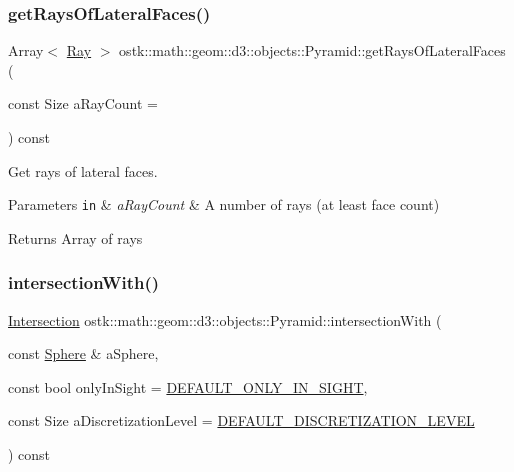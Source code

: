 \subsubsection{\texorpdfstring{get\+Rays\+Of\+Lateral\+Faces()}{getRaysOfLateralFaces()}}
{\footnotesize\ttfamily Array$<$ \hyperlink{classostk_1_1math_1_1geom_1_1d3_1_1objects_1_1_ray}{Ray} $>$ ostk\+::math\+::geom\+::d3\+::objects\+::\+Pyramid\+::get\+Rays\+Of\+Lateral\+Faces (\begin{DoxyParamCaption}\item[{const Size}]{a\+Ray\+Count = {} }\end{DoxyParamCaption}) const}



Get rays of lateral faces. 


\begin{DoxyParams}[1]{Parameters}
\mbox{\tt in}  & {\em a\+Ray\+Count} & A number of rays (at least face count) \\
\hline
\end{DoxyParams}
\begin{DoxyReturn}{Returns}
Array of rays 
\end{DoxyReturn}
\mbox{\label{classostk_1_1math_1_1geom_1_1d3_1_1objects_1_1_pyramid_a254b6d83bb83794852fe13317728ddf0}} 
\subsubsection{\texorpdfstring{intersection\+With()}{intersectionWith()}\hspace{0.1cm}{\footnotesize\ttfamily [1/2]}}
{\footnotesize\ttfamily \hyperlink{classostk_1_1math_1_1geom_1_1d3_1_1_intersection}{Intersection} ostk\+::math\+::geom\+::d3\+::objects\+::\+Pyramid\+::intersection\+With (\begin{DoxyParamCaption}\item[{const \hyperlink{classostk_1_1math_1_1geom_1_1d3_1_1objects_1_1_sphere}{Sphere} \&}]{a\+Sphere,  }\item[{const bool}]{only\+In\+Sight = {\ttfamily \hyperlink{_sphere_8hpp_af424617f7c785f4835e2feba5a5640f2}{D\+E\+F\+A\+U\+L\+T\+\_\+\+O\+N\+L\+Y\+\_\+\+I\+N\+\_\+\+S\+I\+G\+HT}},  }\item[{const Size}]{a\+Discretization\+Level = {\ttfamily \hyperlink{_pyramid_8hpp_a3eb9931e85ba4c9718113211e549e91d}{D\+E\+F\+A\+U\+L\+T\+\_\+\+D\+I\+S\+C\+R\+E\+T\+I\+Z\+A\+T\+I\+O\+N\+\_\+\+L\+E\+V\+EL}} }\end{DoxyParamCaption}) const}



